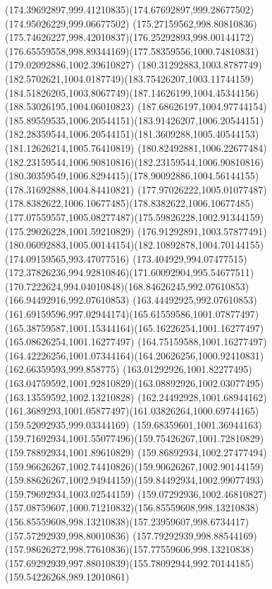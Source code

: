 {    \curveto(174.39692897,999.41210835)(174.67692897,999.28677502)(174.95026229,999.06677502)
    \curveto(175.27159562,998.80810836)(175.74626227,998.42010837)(176.25292893,998.00144172)
    \curveto(176.65559558,998.89344169)(177.58359556,1000.74810831)(179.02092886,1002.39610827)
    \curveto(180.31292883,1003.8787749)(182.5702621,1004.0187749)(183.75426207,1003.11744159)
    \curveto(184.51826205,1003.8067749)(187.14626199,1004.45344156)(188.53026195,1004.06010823)
    \curveto(187.68626197,1004.97744154)(185.89559535,1006.20544151)(183.91426207,1006.20544151)
    \curveto(182.28359544,1006.20544151)(181.3609288,1005.40544153)(181.12626214,1005.76410819)
    \curveto(180.82492881,1006.22677484)(182.23159544,1006.90810816)(182.23159544,1006.90810816)
    \curveto(180.30359549,1006.8294415)(178.90092886,1004.56144155)(178.31692888,1004.84410821)
    \curveto(177.97026222,1005.01077487)(178.8382622,1006.10677485)(178.8382622,1006.10677485)
    \curveto(177.07559557,1005.08277487)(175.59826228,1002.91344159)(175.29026228,1001.59210829)
    \curveto(176.91292891,1003.57877491)(180.06092883,1005.00144154)(182.10892878,1004.70144155)
    \moveto(174.09159565,993.47077516)
    \curveto(173.404929,994.07477515)(172.37826236,994.92810846)(171.60092904,995.54677511)
    \curveto(170.7222624,994.04010848)(168.84626245,992.07610853)(166.94492916,992.07610853)
    \curveto(163.44492925,992.07610853)(161.69159596,997.02944174)(165.61559586,1001.07877497)
    \curveto(165.38759587,1001.15344164)(165.16226254,1001.16277497)(165.08626254,1001.16277497)
    \curveto(164.75159588,1001.16277497)(164.42226256,1001.07344164)(164.20626256,1000.92410831)
    \lineto(162.66359593,999.858775)
    \lineto(163.01292926,1001.82277495)
    \curveto(163.04759592,1001.92810829)(163.08892926,1002.03077495)(163.13559592,1002.13210828)
    \curveto(162.24492928,1001.68944162)(161.3689293,1001.05877497)(161.03826264,1000.69744165)
    \lineto(159.52092935,999.03344169)
    \lineto(159.68359601,1001.36944163)
    \curveto(159.71692934,1001.55077496)(159.75426267,1001.72810829)(159.78892934,1001.89610829)
    \curveto(159.86892934,1002.27477494)(159.96626267,1002.74410826)(159.90626267,1002.90144159)
    \curveto(159.88626267,1002.94944159)(159.84492934,1002.99077493)(159.79692934,1003.02544159)
    \curveto(159.07292936,1002.46810827)(157.08759607,1000.71210832)(156.85559608,998.13210838)
    \curveto(156.85559608,998.13210838)(157.23959607,998.6734417)(157.57292939,998.80010836)
    \curveto(157.79292939,998.88544169)(157.98626272,998.77610836)(157.77559606,998.13210838)
    \curveto(157.69292939,997.88010839)(155.78092944,992.70144185)(159.54226268,989.12010861)
}
